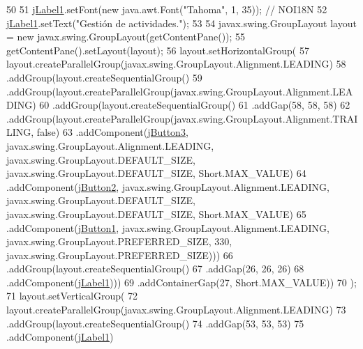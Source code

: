 \begin{DoxyCode}
50 
51         \mbox{\hyperlink{classsoftware_1_1parasoftware_a1478f501551ec89939b3b5f30a7d3181}{jLabel1}}.setFont(\textcolor{keyword}{new} java.awt.Font(\textcolor{stringliteral}{"Tahoma"}, 1, 35)); \textcolor{comment}{// NOI18N}
52         \mbox{\hyperlink{classsoftware_1_1parasoftware_a1478f501551ec89939b3b5f30a7d3181}{jLabel1}}.setText(\textcolor{stringliteral}{"Gestión de actividades."});
53 
54         javax.swing.GroupLayout layout = \textcolor{keyword}{new} javax.swing.GroupLayout(getContentPane());
55         getContentPane().setLayout(layout);
56         layout.setHorizontalGroup(
57             layout.createParallelGroup(javax.swing.GroupLayout.Alignment.LEADING)
58             .addGroup(layout.createSequentialGroup()
59                 .addGroup(layout.createParallelGroup(javax.swing.GroupLayout.Alignment.LEADING)
60                     .addGroup(layout.createSequentialGroup()
61                         .addGap(58, 58, 58)
62                         .addGroup(layout.createParallelGroup(javax.swing.GroupLayout.Alignment.TRAILING, \textcolor{keyword}{
      false})
63                             .addComponent(\mbox{\hyperlink{classsoftware_1_1parasoftware_a4e3c086e2257863c3de29e92e6f8f027}{jButton3}}, javax.swing.GroupLayout.Alignment.LEADING, 
      javax.swing.GroupLayout.DEFAULT\_SIZE, javax.swing.GroupLayout.DEFAULT\_SIZE, Short.MAX\_VALUE)
64                             .addComponent(\mbox{\hyperlink{classsoftware_1_1parasoftware_a2d756706685fceab8e8cc24f7aece0bf}{jButton2}}, javax.swing.GroupLayout.Alignment.LEADING, 
      javax.swing.GroupLayout.DEFAULT\_SIZE, javax.swing.GroupLayout.DEFAULT\_SIZE, Short.MAX\_VALUE)
65                             .addComponent(\mbox{\hyperlink{classsoftware_1_1parasoftware_a38e0fa900147742a3d209603a3289f14}{jButton1}}, javax.swing.GroupLayout.Alignment.LEADING, 
      javax.swing.GroupLayout.PREFERRED\_SIZE, 330, javax.swing.GroupLayout.PREFERRED\_SIZE)))
66                     .addGroup(layout.createSequentialGroup()
67                         .addGap(26, 26, 26)
68                         .addComponent(\mbox{\hyperlink{classsoftware_1_1parasoftware_a1478f501551ec89939b3b5f30a7d3181}{jLabel1}})))
69                 .addContainerGap(27, Short.MAX\_VALUE))
70         );
71         layout.setVerticalGroup(
72             layout.createParallelGroup(javax.swing.GroupLayout.Alignment.LEADING)
73             .addGroup(layout.createSequentialGroup()
74                 .addGap(53, 53, 53)
75                 .addComponent(\mbox{\hyperlink{classsoftware_1_1parasoftware_a1478f501551ec89939b3b5f30a7d3181}{jLabel1}})

\end{DoxyCode}
